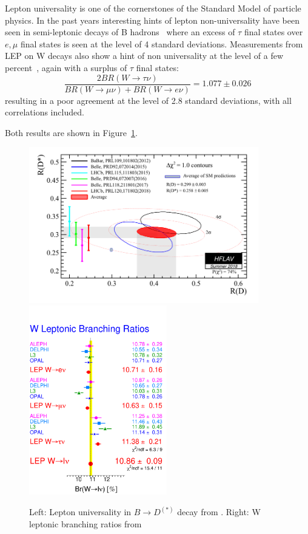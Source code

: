 Lepton universality is one of the cornerstones of the Standard Model of particle physics. 
In the past years interesting hints of lepton non-universality have been seen in semi-leptonic decays of B hadrons~\cite{HFLAV16} where an excess of $\tau$ final states over $e,\mu$ final states is seen at the level of 4 standard deviations.
Measurements from LEP on W decays also show a hint of non universality at the level of a few percent~\cite{LEP-2}, again with a surplus of $\tau$ final states: 
\begin{equation}
  \label{eq:LEP_BRoverBRAll}
  \frac{2BR(W\to\tau\nu)}{BR(W\to\mu\nu)+BR(W\to e\nu)} = 1.077 \pm 0.026
\end{equation}
resulting in a poor agreement at the level of 2.8 standard deviations, with all correlations included.

Both results are shown in Figure~\ref{fig:lnuhints}.

\begin{figure}[htbp]
\centering
\includegraphics[width=10cm]{figures/01_intro/rdrds_summer18.png}
\includegraphics[width=6cm]{figures/01_intro/4f_brlv_lep_2008.pdf}
\caption{Left: Lepton universality in $B\to D^{(*)}$ decay from \cite{HFLAV16}. 
Right:  W leptonic branching ratios from \cite{LEP-2}}
\label{fig:lnuhints}
\end{figure}



